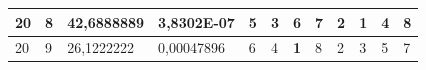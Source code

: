 \documentclass[conference]{IEEEtran}
\begin{document}
\begin{table}[]
\begin{tabular}{|llll|llllllll|}
		\multicolumn{1}{|l|}{20}  & \multicolumn{1}{l|}{8}         & \multicolumn{1}{l|}{42,6888889}    & 3,8302E-07 & \multicolumn{1}{l|}{5}   & \multicolumn{1}{l|}{3}          & \multicolumn{1}{l|}{6}          & \multicolumn{1}{l|}{7}   & \multicolumn{1}{l|}{2}          & \multicolumn{1}{l|}{\textbf{1}} & \multicolumn{1}{l|}{4}          & 8                      \\ \hline
		\multicolumn{1}{|l|}{20}  & \multicolumn{1}{l|}{9}         & \multicolumn{1}{l|}{26,1222222}    & 0,00047896 & \multicolumn{1}{l|}{6}   & \multicolumn{1}{l|}{4}          & \multicolumn{1}{l|}{\textbf{1}} & \multicolumn{1}{l|}{8}   & \multicolumn{1}{l|}{2}          & \multicolumn{1}{l|}{3}          & \multicolumn{1}{l|}{5}          & 7                      \\ \hline
	\end{tabular}
\end{table}

\end{document}
